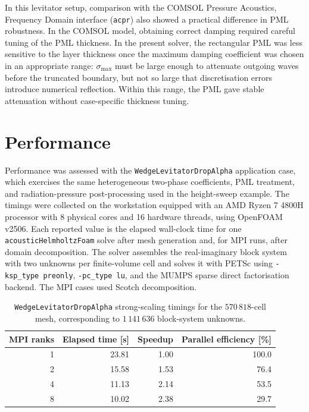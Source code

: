 \documentclass[final,num,12pt]{elsarticle}
\begin{document}
In this levitator setup, comparison with the COMSOL Pressure Acoustics, Frequency Domain interface (\texttt{acpr}) also showed a practical difference in PML robustness.  In the COMSOL model, obtaining correct damping required careful tuning of the PML thickness.  In the present solver, the rectangular PML was less sensitive to the layer thickness once the maximum damping coefficient was chosen in an appropriate range: $\sigma_{\max}$ must be large enough to attenuate outgoing waves before the truncated boundary, but not so large that discretisation errors introduce numerical reflection.  Within this range, the PML gave stable attenuation without case-specific thickness tuning.

\FloatBarrier
\section{Performance}
\label{sec:performance}
Performance was assessed with the \texttt{WedgeLevitatorDropAlpha} application case, which exercises the same heterogeneous two-phase coefficients, PML treatment, and radiation-pressure post-processing used in the height-sweep example.  The timings were collected on the workstation equipped with an AMD Ryzen 7 4800H processor with 8 physical cores and 16 hardware threads, using OpenFOAM v2506.  Each reported value is the elapsed wall-clock time for one \texttt{acousticHelmholtzFoam} solve after mesh generation and, for MPI runs, after domain decomposition.  The solver assembles the real-imaginary block system with two unknowns per finite-volume cell and solves it with PETSc using \texttt{-ksp\_type preonly}, \texttt{-pc\_type lu}, and the MUMPS sparse direct factorisation backend.  The MPI cases used Scotch decomposition. 

\begin{table}[H]
    \centering
    \caption{\texttt{WedgeLevitatorDropAlpha} strong-scaling timings for the $570\,818$-cell mesh, corresponding to $1\,141\,636$ block-system unknowns.}
    \label{tab:dropAlphaStrongScaling}
    \begin{tabular}{rrrr}
        \toprule
        MPI ranks & Elapsed time [s] & Speedup & Parallel efficiency [\%] \\
        \midrule
        1 & 23.81 & 1.00 & 100.0 \\
        2 & 15.58 & 1.53 & 76.4 \\
        4 & 11.13 & 2.14 & 53.5 \\
        8 & 10.02 & 2.38 & 29.7 \\
        \bottomrule
    \end{tabular}
\end{table}
\end{document}
